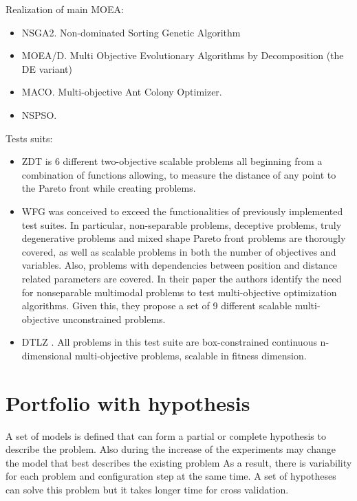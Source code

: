         Realization of main MOEA:
        \begin{itemize}
            \item NSGA2. Non-dominated Sorting Genetic Algorithm
            \item MOEA/D. Multi Objective Evolutionary Algorithms by Decomposition (the DE variant)
            \item MACO. Multi-objective Ant Colony Optimizer.
            \item NSPSO. 
        \end{itemize}

        Tests suits:
        \begin{itemize}
            \item ZDT \cite{ZitzlerDT00} is 6 different two-objective scalable problems all beginning from a combination of functions allowing, to measure the distance of any point to the Pareto front while creating problems.
            \item WFG \cite{WFGref} was conceived to exceed the functionalities of previously implemented test suites. In particular, non-separable problems, deceptive problems, truly degenerative problems and mixed shape Pareto front problems are thorougly covered, as well as scalable problems in both the number of objectives and variables. Also, problems with dependencies between position and distance related parameters are covered. In their paper the authors identify the need for nonseparable multimodal problems to test multi-objective optimization algorithms. Given this, they propose a set of 9 different scalable multi-objective unconstrained problems.
            \item DTLZ \cite{DebTLZ05}. All problems in this test suite are box-constrained continuous n-dimensional multi-objective problems, scalable in fitness dimension.
        \end{itemize}



\section{Portfolio with hypothesis}
A set of models is defined that can form a partial or complete hypothesis to describe the problem.
Also during the increase of the experiments may change the model that best describes the existing problem
As a result, there is variability for each problem and configuration step at the same time. 
A set of hypotheses can solve this problem but it takes longer time for cross validation.


